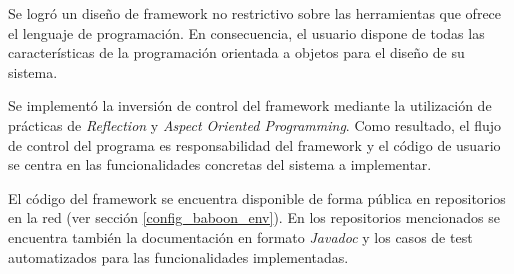 Se logró un diseño de framework no restrictivo sobre las herramientas
que ofrece el lenguaje de programación. En consecuencia, el usuario dispone
de todas las características de la programación orientada a objetos para el
diseño de su sistema.

Se implementó la inversión de control del framework mediante la utilización de
prácticas de \textit{Reflection} y \textit{Aspect Oriented Programming}. Como
resultado, el flujo de control del programa es responsabilidad del framework y
el código de usuario se centra en las funcionalidades concretas del sistema a implementar.

El código del framework se encuentra disponible de forma pública en repositorios
en la red (ver sección \ref{config_baboon_env}). En los repositorios mencionados
se encuentra también la documentación en formato \textit{Javadoc} y los casos de
test automatizados para las funcionalidades implementadas.

